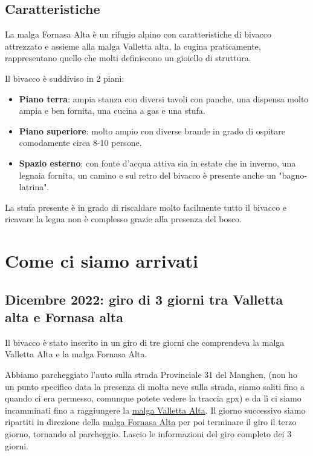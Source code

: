\documentclass{article}
\begin{document}
\subsection{Caratteristiche}
La malga Fornasa Alta è un rifugio alpino con caratteristiche di bivacco attrezzato e assieme alla malga Valletta alta, la cugina praticamente, rappresentano quello che molti definiscono un gioiello di struttura.

Il bivacco è suddiviso in 2 piani:
\begin{itemize}
    \item \textbf{Piano terra}: ampia stanza con diversi tavoli con panche, una dispensa molto ampia e ben fornita, una cucina a gas e una stufa.
    \item \textbf{Piano superiore}: molto ampio con diverse brande in grado di ospitare comodamente circa 8-10 persone. 
    \item \textbf{Spazio esterno}: con fonte d'acqua attiva sia in estate che in inverno, una legnaia fornita, un camino e sul retro del bivacco è presente anche un "bagno-latrina".
\end{itemize}

La stufa presente è in grado di riscaldare molto facilmente tutto il bivacco e ricavare la legna non è complesso grazie alla presenza del bosco. 


\section{Come ci siamo arrivati}
\subsection{Dicembre 2022: giro di 3 giorni tra Valletta alta e Fornasa alta}
Il bivacco è stato inserito in un giro di tre giorni che comprendeva la malga Valletta Alta e la malga Fornasa Alta.

Abbiamo parcheggiato l’auto sulla strada Provinciale 31 del Manghen, (non ho un punto specifico data la presenza di molta neve sulla strada, siamo saliti fino a quando ci era permesso, comunque potete vedere la traccia gpx) e da lì ci siamo incamminati fino a raggiungere la \href{https://maps.google.com/?q=46.18633,11.39534}{malga Valletta Alta}. Il giorno successivo siamo ripartiti in direzione della \href{https://maps.google.com/?q=46.17745,11.40920}{malga Fornasa Alta} per poi terminare il giro il terzo giorno, tornando al parcheggio.
Lascio le informazioni del giro completo dei 3 giorni.
\end{document}
